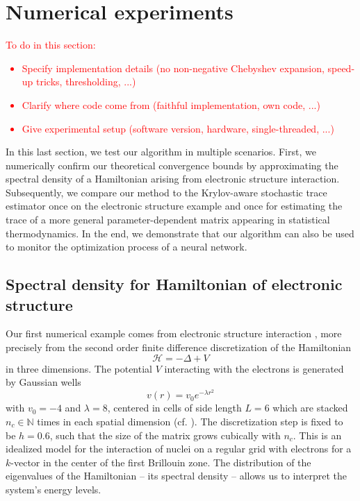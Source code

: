 
\section{Numerical experiments}
\label{sec:results}

\color{black}
\textcolor{red}{
To do in this section:
\begin{itemize}
    \item Specify implementation details (no non-negative Chebyshev expansion, speed-up tricks, thresholding, ...)
    \item Clarify where code come from (faithful implementation, own code, ...)
    \item Give experimental setup (software version, hardware, single-threaded, ...)
\end{itemize}
}

In this last section, we test our algorithm in multiple scenarios. First, we numerically confirm our theoretical convergence bounds by approximating the spectral density of a Hamiltonian arising from electronic structure interaction. Subsequently, we compare our method to the Krylov-aware stochastic trace estimator \cite{chen-2023-krylovaware-stochastic} once on the electronic structure example and once for estimating the trace of a more general parameter-dependent matrix appearing in statistical thermodynamics. In the end, we demonstrate that our algorithm can also be used to monitor the optimization process of a neural network.

\subsection{Spectral density for Hamiltonian of electronic structure}
\label{subsec:hamiltonian}

Our first numerical example comes from electronic structure interaction \cite{lin-2017-randomized-estimation}, more precisely from the second order finite difference discretization of the Hamiltonian
\begin{equation}
    \mathcal{H} = - \Delta + V
    \label{equ:5-experiments-electronic-hamiltonian}
\end{equation}
in three dimensions. The potential $V$ interacting with the electrons is generated by Gaussian wells
\begin{equation}
    v(r) = v_0 e^{-\lambda r^2}
    \label{equ:5-experiments-gaussian-cell}
\end{equation}
with $v_0 = -4$ and $\lambda = 8$, centered in cells of side length $L=6$ which are stacked $n_c \in \mathbb{N}$ times in each spatial dimension (cf. ). The discretization step is fixed to be $h=0.6$, such that the size of the matrix grows cubically with $n_c$. This is an idealized model for the interaction of nuclei on a regular grid with electrons for a $k$-vector in the center of the first Brillouin zone. The distribution of the eigenvalues of the Hamiltonian -- its spectral density -- allows us to interpret the system's energy levels.

